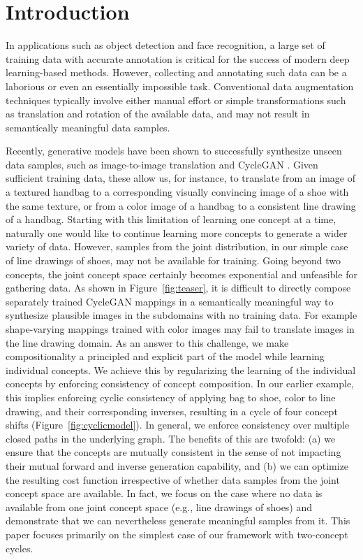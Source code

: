 \documentclass[10pt,twocolumn,letterpaper]{article}
\begin{document}
\section{Introduction}
\thispagestyle{empty}
In applications such as object detection and face recognition, a large set of training data with accurate annotation is critical for the success of modern deep learning-based methods. However, collecting and annotating such data can be a laborious or even an essentially impossible task. Conventional data augmentation techniques typically involve either manual effort or simple transformations such as translation and rotation of the available data, and may not result in semantically meaningful data samples.





Recently, generative models have been shown to successfully synthesize unseen data samples, such as image-to-image translation and CycleGAN \cite{CycleGAN,DiscoGAN}. Given sufficient training data, these allow us, for instance, to translate from an image of a textured handbag to a corresponding visually convincing image of a shoe with the same texture, or from a color image of a handbag to a consistent line drawing of a handbag. Starting with this limitation of learning one concept at a time, naturally one would like to continue learning more concepts to generate a wider variety of data. However, samples from the joint distribution, in our simple case of line drawings of shoes, may not be available for training. Going beyond two concepts, the joint concept space certainly becomes exponential and unfeasible for gathering data. As shown in Figure~\ref{fig:teaser}, it is difficult to directly compose separately trained CycleGAN mappings in a semantically meaningful way to synthesize plausible images in the subdomains with no training data. For example shape-varying mappings trained with color images may fail to translate images in the line drawing domain. As an answer to this challenge, we make compositionality a principled and explicit part of the model while learning individual concepts. We achieve this by regularizing the learning of the individual concepts by enforcing consistency of concept composition. In our earlier example, this implies enforcing cyclic consistency of applying bag to shoe, color to line drawing, and their corresponding inverses, resulting in a cycle of four concept shifts (Figure~\ref{fig:cyclicmodel}). In general, we enforce consistency over multiple closed paths in the underlying graph. The benefits of this are twofold: (a) we ensure that the concepts are mutually consistent in the sense of not impacting their mutual forward and inverse generation capability, and (b) we can optimize the resulting cost function irrespective of whether data samples from the joint concept space are available. In fact, we focus on the case where no data is available from one joint concept space (e.g., line drawings of shoes) and demonstrate that we can nevertheless generate meaningful samples from it. This paper focuses primarily on the simplest case of our framework with two-concept cycles. 
\end{document}
